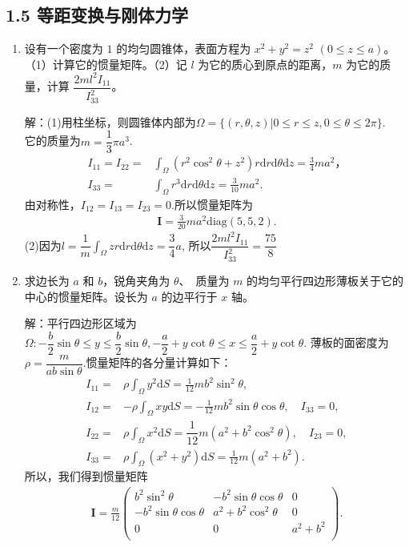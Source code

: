 \subsection{1.5 等距变换与刚体力学}
\begin{enumerate}
    \item 设有一个密度为 $1$ 的均匀圆锥体，表面方程为 $x^2+y^2=z^2$ $(0 \leqslant z \leqslant a)$。
    （1）计算它的惯量矩阵。（2）记 $l$ 为它的质心到原点的距离，$m$ 为它的质量，计算 $\dfrac{2ml^2I_{11}}{I_{33}^2}$。

    解：(1)用柱坐标，则圆锥体内部为$\Omega =\{(r,\theta, z)|0\leq r \leq z, 0\leq \theta \leq 2\pi\}$.\\
    它的质量为$m=\dfrac{1}{3}\pi a^3$.
    \begin{align*}
        I_{11}=I_{22}=&\int_{\Omega}{(r^2\cos^2\theta+z^2)r\text{d}r\text{d}\theta\text{d}z}=\frac{3}{4}ma^2，\\
        I_{33}=&\int_{\Omega}r^3\text{d}r\text{d}\theta\text{d}z=\frac{3}{10}ma^2.
    \end{align*}
    由对称性，$I_{12}=I_{13}=I_{23}=0$.所以惯量矩阵为
    \begin{align*}
        \boldsymbol{I}=\frac{3}{20}ma^2\text{diag}(5,5,2).
    \end{align*}
    (2)因为$l=\dfrac{1}{m}\displaystyle \int_{\Omega}zr\text{d}r\text{d}\theta\text{d}z=\dfrac{3}{4}a$,
    所以$\dfrac{2ml^2I_{11}}{I^2_{33}}=\dfrac{75}{8}$

    \item 求边长为 $a$ 和 $b$，锐角夹角为 $\theta$、\ 质量为 $m$ 的均匀平行四边形薄板关于它的中心的惯量矩阵。设长为 $a$ 的边平行于 $x$ 轴。
    
    解：平行四边形区域为$\Omega:-\dfrac{b}{2}\sin\theta\leq y \leq\dfrac{b}{2}\sin \theta, -\dfrac{a}{2}+y\cot \theta\leq x
    \leq \dfrac{a}{2}+y\cot \theta$.
    薄板的面密度为$\rho =\dfrac{m}{ab\sin\theta}$.惯量矩阵的各分量计算如下：
    \begin{align*}
        I_{11}=&\rho\int_{\Omega}y^2\text{d}S=\frac{1}{12}mb^2\sin^2\theta,\\
        I_{12}=&-\rho\int_{\Omega}xy\text{d}S=-\frac{1}{12}mb^2\sin\theta\cos\theta, \quad I_{33}=0,\\
        I_{22}=&\rho\int_{\Omega}x^2\text{d}S=\dfrac{1}{12}m(a^2+b^2\cos^2\theta), \quad I_{23}=0,\\
        I_{33}=&\rho\int_{\Omega}(x^2+y^2)\text{d}S=\frac{1}{12}m(a^2+b^2).
    \end{align*}
    所以，我们得到惯量矩阵
    \begin{align*}
        \boldsymbol{I}=\frac{m}{12}\begin{pmatrix}
            b^2\sin^2\theta & -b^2\sin\theta\cos\theta & 0 \\
            -b^2\sin\theta\cos\theta & a^2+b^2\cos^2\theta & 0 \\
            0 & 0 & a^2+b^2 \\
        \end{pmatrix}.
    \end{align*}


\end{enumerate}
